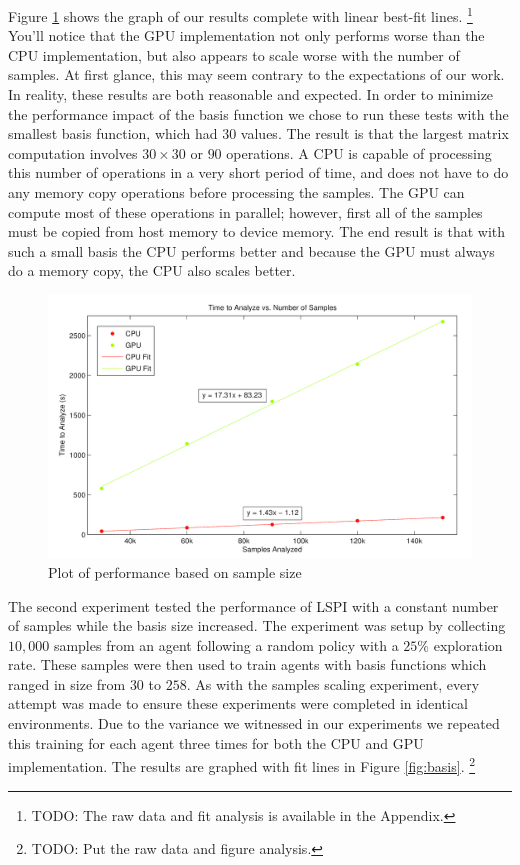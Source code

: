 Figure \ref{fig:samples} shows the graph of our results complete with linear best-fit lines. \footnote{TODO: The raw data and fit analysis is available in the Appendix.} You'll notice that the GPU implementation not only performs worse than the CPU implementation, but also appears to scale worse with the number of samples. At first glance, this may seem contrary to the expectations of our work. In reality, these results are both reasonable and expected. In order to minimize the performance impact of the basis function we chose to run these tests with the smallest basis function, which had $30$ values. The result is that the largest matrix computation involves $30 \times 30$ or $90$ operations. A CPU is capable of processing this number of operations in a very short period of time, and does not have to do any memory copy operations before processing the samples. The GPU can compute most of these operations in parallel; however, first all of the samples must be copied from host memory to device memory. The end result is that with such a small basis the CPU performs better and because the GPU must always do a memory copy, the CPU also scales better.

\begin{figure}
	\includegraphics[width=\textwidth]{Time_vs_Samples.png}
    \caption{Plot of performance based on sample size}
	\label{fig:samples}
\end{figure}

The second experiment tested the performance of LSPI with a constant number of samples while the basis size increased. The experiment was setup by collecting $10,000$ samples from an agent following a random policy with a $25\%$ exploration rate. These samples were then used to train agents with basis functions which ranged in size from $30$ to $258$. As with the samples scaling experiment, every attempt was made to ensure these experiments were completed in identical environments. Due to the variance we witnessed in our experiments we repeated this training for each agent three times for both the CPU and GPU implementation. The results are graphed with fit lines in Figure \ref{fig:basis}. \footnote{TODO: Put the raw data and figure analysis.}

